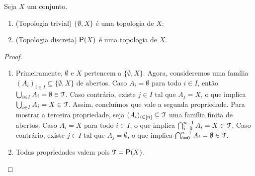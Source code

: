 \begin{proposition}
	Seja $X$ um conjunto.
	\begin{enumerate}
	\item (Topologia trivial) $\{\emptyset,X\}$ é uma topologia de $X$;
	\item (Topologia discreta) $\p(X)$ é uma topologia de $X$.
	\end{enumerate}
\end{proposition}
\begin{proof}
	\begin{enumerate}
	\item Primeiramente, $\emptyset$ e $X$ pertencem a $\{\emptyset,X\}$. Agora, consideremos uma família $(A_i)_{i \in I} \subseteq \{\emptyset,X\}$ de abertos. Caso $A_i = \emptyset$ para todo $i \in I$, então $\bigcup_{i \in I} A_i = \emptyset \in \mathcal{T}$. Caso contrário, existe $j \in I$ tal que $A_j = X$, o que implica $\bigcup_{i \in I} A_i = X \in \mathcal{T}$. Assim, concluímos que vale a segunda propriedade. Para mostrar a terceira propriedade, seja $(A_i)_{i \in [n]} \subseteq \mathcal{T}$ uma família finita de abertos. Caso $A_i=X$ para todo $i \in I$, o que implica $\bigcap_{i=0}^{n-1} A_i = X \in \mathcal{T}$, Caso contrário, existe $j \in I$ tal que $A_j = \emptyset$, o que implica $\bigcap_{i=0}^{n-1} A_i = \emptyset \in \mathcal{T}$.

	\item Todas propriedades valem pois $\topo = \p(X)$.
\qedhere
	\end{enumerate}
\end{proof}



